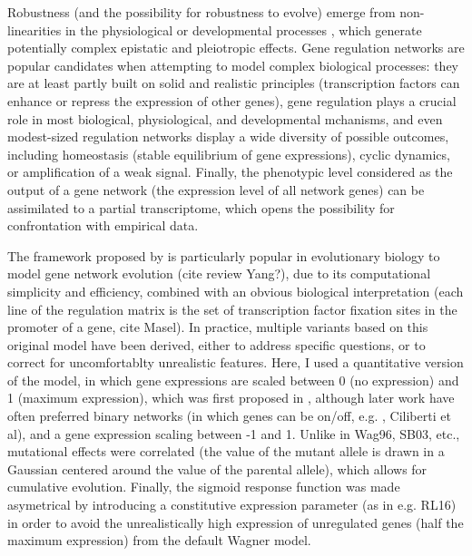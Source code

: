 \documentclass[a4paper]{article}
\begin{document}
Robustness (and the possibility for robustness to evolve) emerge from non-linearities in the physiological or developmental processes \citep{Nij02}, which generate potentially complex epistatic and pleiotropic effects. Gene regulation networks are popular candidates when attempting to model complex biological processes: they are at least partly built on solid and realistic principles (transcription factors can enhance or repress the expression of other genes), gene regulation plays a crucial role in most biological, physiological, and developmental mchanisms, and even modest-sized regulation networks display a wide diversity of possible outcomes, including homeostasis (stable equilibrium of gene expressions), cyclic dynamics, or amplification of a weak signal. Finally, the phenotypic level considered as the output of a gene network (the expression level of all network genes) can be assimilated to a partial transcriptome, which opens the possibility for confrontation with empirical data. 

The framework proposed by \citep{Wag94,Wag96} is particularly popular in evolutionary biology to model gene network evolution (cite review Yang?), due to its computational simplicity and efficiency, combined with an obvious biological interpretation (each line of the regulation matrix is the set of transcription factor fixation sites in the promoter of a gene, cite Masel). In practice, multiple variants based on this original model have been derived, either to address specific questions, or to correct for uncomfortablty unrealistic features. Here, I used a quantitative version of the model, in which gene expressions are scaled between 0 (no expression) and 1 (maximum expression), which was first proposed in \citep{Wag94}, although later work have often preferred  binary networks (in which genes can be on/off, e.g. \citep{Wag96}, Ciliberti et al), and a gene expression scaling between -1 and 1. Unlike in Wag96, SB03, etc., mutational effects were correlated (the value of the mutant allele is drawn in a Gaussian centered around the value of the parental allele), which allows for cumulative evolution. Finally, the sigmoid response function was made asymetrical by introducing a constitutive expression parameter (as in e.g. RL16) in order to avoid the unrealistically high expression of unregulated genes (half the maximum expression) from the default Wagner model. 
\end{document}
